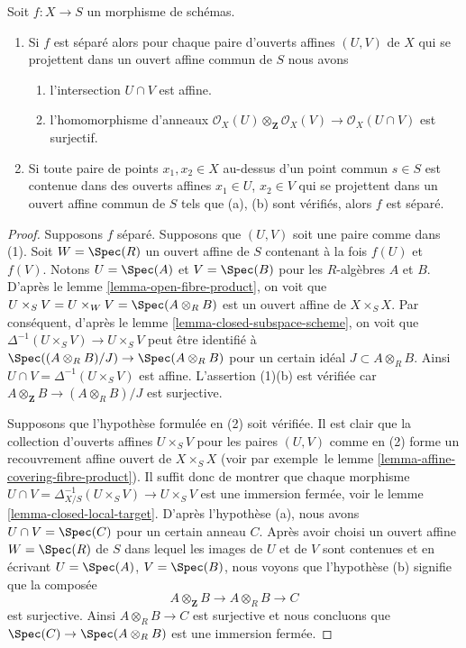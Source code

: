 \begin{lemma}
\label{lemma-characterize-separated}
Soit $f : X \to S$ un morphisme de schémas.
\begin{enumerate}
\item Si $f$ est séparé alors pour chaque paire d'ouverts affines
$(U, V)$ de $X$ qui se projettent dans un
ouvert affine commun de $S$ nous avons
\begin{enumerate}
\item l'intersection $U \cap V$ est affine. \item
l'homomorphisme
d'anneaux $\mathcal{O}_X(U) \otimes_{\mathbf{Z}} \mathcal{O}_X(V)
\to \mathcal{O}_X(U \cap V)$
est surjectif.
\end{enumerate}
\item Si toute paire de points $x_1, x_2 \in X$ au-dessus d'un point commun
$s \in S$ est contenue dans des ouverts affines $x_1 \in U$, $x_2
\in V$ qui se projettent dans un ouvert affine commun de $S$ tels
que (a), (b) sont vérifiés, alors $f$ est séparé.
\end{enumerate}
\end{lemma}

\begin{proof}
Supposons $f$ séparé. Supposons que $(U, V)$ soit une paire comme
dans (1). Soit $W = \Spec(R)$ un ouvert affine de $S$ contenant
à la fois $f(U)$ et $f(V)$. Notons $U = \Spec(A)$
et $V = \Spec(B)$ pour les $R$-algèbres $A$ et
$B$. D'après le lemme \ref{lemma-open-fibre-product}, on
voit que $U \times_S V = U \times_W V = \Spec(A \otimes_R
B)$ est un ouvert affine de $X \times_S X$. Par
conséquent, d'après le lemme \ref{lemma-closed-subspace-scheme},
on voit que $\Delta^{-1}(U \times_S V) \to U
\times_S V$ peut être identifié à $\Spec((A \otimes_R B)/J) \to \Spec(A \otimes_R
B)$ pour un certain idéal $J \subset A \otimes_R
B$. Ainsi $U \cap V = \Delta^{-1}(U \times_S V)$ est affine.
L'assertion (1)(b) est vérifiée
car $A \otimes_{\mathbf{Z}} B \to (A \otimes_R B)/J$ est surjective.

\medskip\noindent
Supposons que l'hypothèse formulée en (2) soit vérifiée.
Il est clair que la collection d'ouverts affines $U \times_S
V$ pour les paires $(U, V)$ comme en (2) forme un recouvrement affine
ouvert de $X \times_S X$ (voir par exemple\ le lemme \ref{lemma-affine-covering-fibre-product}).
Il suffit donc de montrer que chaque morphisme
$U \cap V = \Delta_{X/S}^{-1}(U \times_S V) \to U \times_S V$ est une
immersion fermée, voir le lemme \ref{lemma-closed-local-target}. D'après
l'hypothèse (a), nous avons $U \cap V = \Spec(C)$ pour un certain anneau $C$. Après
avoir choisi un ouvert affine $W = \Spec(R)$ de $S$ dans
lequel les images de $U$ et de $V$ sont contenues et en écrivant $U =
\Spec(A)$, $V = \Spec(B)$, nous voyons que l'hypothèse (b)
signifie que la composée
$$
A \otimes_{\mathbf{Z}} B \to A \otimes_R B \to C
$$
est surjective. Ainsi $A \otimes_R B \to C$ est surjective et nous
concluons que $\Spec(C) \to \Spec(A \otimes_R B)$ est
une immersion fermée.
\end{proof}

